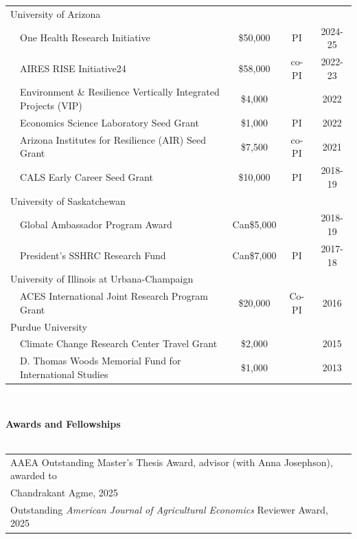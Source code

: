 \documentclass[letterpaper]{article}
\renewenvironment{itemize}{
  \begin{list}
  	{}{
    \setlength{\leftmargin}{1.5em}
    \setlength{\itemsep}{-.5em}
  }
}{
  \end{list}
}
\begin{document}
\begin{itemize}
	\begin{tabular}{llccc}
		\multicolumn{5}{p{\linewidth}}{\sc University of Arizona} \\
		&\multicolumn{1}{l}{One Health Research Initiative}	& \$50,000 	& PI			& 2024-25 \\	
		&\multicolumn{1}{l}{AIRES RISE Initiative24}	& \$58,000 	& co-PI			& 2022-23 \\	
		&\multicolumn{1}{l}{Environment \& Resilience Vertically Integrated Projects (VIP)}	& \$4,000 	& 			& 2022 \\
        &\multicolumn{1}{l}{Economics Science Laboratory Seed Grant}	& \$1,000 	& PI			& 2022 \\	
		&\multicolumn{1}{l}{Arizona Institutes for Resilience (AIR) Seed Grant}	& \$7,500 	& co-PI			& 2021 \\
		&\multicolumn{1}{l}{CALS Early Career Seed Grant}	& \$10,000 	& PI			& 2018-19 \\	
		\multicolumn{5}{p{\linewidth}}{\sc University of Saskatchewan} \\
		&\multicolumn{1}{l}{Global Ambassador Program Award}	& Can\$5,000	& 			& 2018-19 \\	
		&\multicolumn{1}{l}{President's SSHRC Research Fund}	& Can\$7,000	& PI			& 2017-18 \\	
		\multicolumn{5}{p{\linewidth}}{\sc University of Illinois at Urbana-Champaign} \\
		&\multicolumn{1}{l}{ACES International Joint Research Program Grant}	& \$20,000	& Co-PI			& 2016 \\
		\multicolumn{5}{p{\linewidth}}{\sc Purdue University} \\
		&\multicolumn{1}{l}{Climate Change Research Center Travel Grant}	& \$2,000	& 			& 2015 \\
		&\multicolumn{1}{l}{D. Thomas Woods Memorial Fund for International Studies}	& \$1,000	& 			& 2013 \\
	\end{tabular}
	\\
	\leftskip 0in
	\item {\bf Awards and Fellowships} \\
    \\
	\begin{tabular}{l}
		AAEA Outstanding Master's Thesis Award, advisor (with Anna Josephson), awarded to \\
		\hspace{0.1cm} Chandrakant Agme, 2025 \\
		Outstanding \emph{American Journal of Agricultural Economics} Reviewer Award, 2025 \\

\end{tabular}
\end{itemize}
\end{document}
